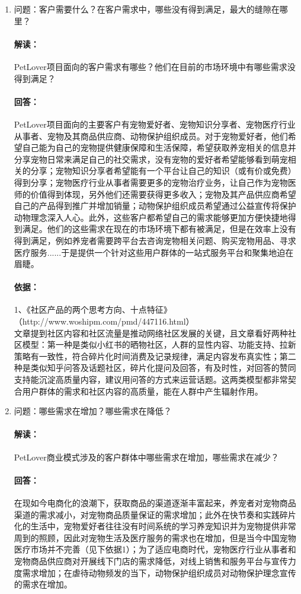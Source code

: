 \documentclass[a4paper]{ctexart}
\begin{document}
\begin{enumerate}[label=\alph*.]
  \item 问题：客户需要什么？在客户需求中，哪些没有得到满足，最大的缝隙在哪里？
  \paragraph{解读：}PetLover项目面向的客户需求有哪些？他们在目前的市场环境中有哪些需求没得到满足？
  \paragraph{回答：}PetLover项目面向的主要客户有宠物爱好者、宠物知识分享者、宠物医疗行业从事者、宠物及其商品供应商、动物保护组织成员。对于宠物爱好者，他们希望自己能为自己的宠物提供健康保障和生活保障，希望获取养宠相关的信息并分享宠物日常来满足自己的社交需求，没有宠物的爱好者希望能够看到萌宠相关的分享；宠物知识分享者希望能有一个平台让自己的知识（或有价或免费）得到分享；宠物医疗行业从事者需要更多的宠物治疗业务，让自己作为宠物医师的价值得到体现，另外他们还需要获得更多收入；宠物及其产品供应商希望自己的产品得到推广并增加销量；动物保护组织成员希望通过公益宣传将保护动物理念深入人心。此外，这些客户都希望自己的需求能够更加方便快捷地得到满足。他们的这些需求在现在的市场环境下都有被满足，但是在效率上没有得到满足，例如养宠者需要跨平台去咨询宠物相关问题、购买宠物用品、寻求医疗服务......于是提供一个针对这些用户群体的一站式服务平台和聚集地迫在眉睫。
  \paragraph{依据：}1、《社区产品的两个思考方向、十点特征》\\（http://www.woshipm.com/pmd/447116.html）\\
  文章提到社区内容和社区流量是推动网络社区发展的关键，且文章看好两种社区模型：第一种是类似小红书的晒物社区，人群的显性内容、功能支持、拉新策略有一致性，符合碎片化时间消费及记录规律，满足内容发布真实性；第二种是类似知乎问答及话题社区，碎片化提问及回答，有及时性，对回答的赞同支持能沉淀高质量内容，建议用问答的方式来运营话题。这两类模型都非常契合用户群体的需求和社区内容的高质量，能在人群中产生辐射作用。
  \item 问题：哪些需求在增加？哪些需求在降低？
  \paragraph{解读：}PetLover商业模式涉及的客户群体中哪些需求在增加，哪些需求在减少？
  \paragraph{回答：}在现如今电商化的浪潮下，获取商品的渠道逐渐丰富起来，养宠者对宠物商品渠道的需求减小，对宠物商品质量保证的需求增加；此外在快节奏和实践碎片化的生活中，宠物爱好者往往没有时间系统的学习养宠知识并为宠物提供非常周到的照顾，因此对宠物生活及医疗服务的需求也在增加，但是当今中国宠物医疗市场并不完善（见下依据1）；为了适应电商时代，宠物医疗行业从事者和宠物商品供应商对开展线下门店的需求降低，对线上销售和服务平台与宣传力度需求增加；在虐待动物频发的当下，动物保护组织成员对动物保护理念宣传的需求在增加。

\end{enumerate}
\end{document}
